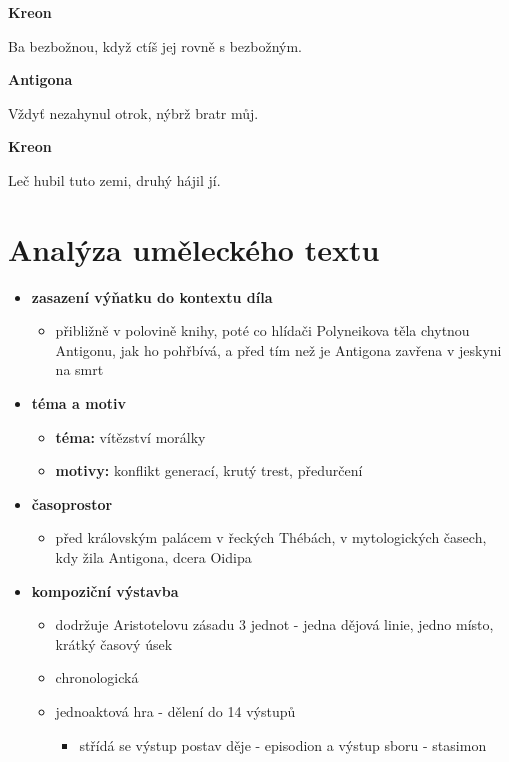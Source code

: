 \documentclass[11pt]{article}
\begin{document}
    \textbf{Kreon}

    Ba bezbožnou, když ctíš jej rovně s bezbožným.

    \textbf{Antigona}

    Vždyť nezahynul otrok, nýbrž bratr můj.

    \textbf{Kreon}

    Leč hubil tuto zemi, druhý hájil jí.
    \section*{Analýza uměleckého textu}
    \begin{itemize}
        \item\textbf{zasazení výňatku do kontextu díla}
        \begin{itemize}
            \item přibližně v polovině knihy, poté co hlídači Polyneikova těla chytnou Antigonu, jak ho pohřbívá, a před tím než je Antigona zavřena v jeskyni na smrt
        \end{itemize}
        \item\textbf{téma a motiv}
        \begin{itemize}
            \item \textbf{téma:} vítězství morálky
            \item \textbf{motivy:} konflikt generací, krutý trest, předurčení
        \end{itemize}
        \item\textbf{časoprostor}
        \begin{itemize}
            \item před královským palácem v řeckých Thébách, v mytologických časech, kdy žila Antigona, dcera Oidipa
        \end{itemize}
        \item\textbf{kompoziční výstavba}
        \begin{itemize}
            \item dodržuje Aristotelovu zásadu 3 jednot - jedna dějová linie, jedno místo, krátký časový úsek
            \item chronologická
            \item jednoaktová hra - dělení do 14 výstupů
            \begin{itemize}
                \item střídá se výstup postav děje - episodion a výstup sboru - stasimon
            \end{itemize}
        \end{itemize}

\end{itemize}
\end{document}
